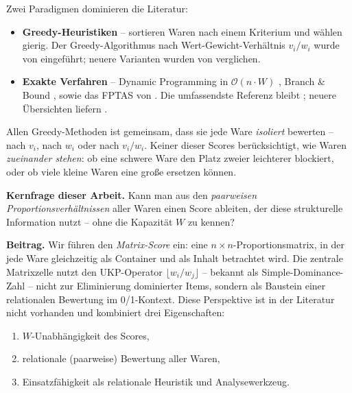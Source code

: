 \documentclass[a4paper,11pt]{article}
\begin{document}
\medskip
Zwei Paradigmen dominieren die Literatur:
\begin{itemize}[leftmargin=*,topsep=2pt]
  \item \textbf{Greedy-Heuristiken} -- sortieren Waren nach einem Kriterium
    und wählen gierig. Der Greedy-Algorithmus nach Wert-Gewicht-Verhältnis
    $v_i/w_i$ wurde von \citet{dantzig1957} eingeführt; neuere Varianten
    wurden von \citet{hristakeva2005,hristakeva2023} verglichen.
  \item \textbf{Exakte Verfahren} -- Dynamic Programming in
    $\mathcal{O}(n\cdot W)$ \citep{bellman1957}, Branch \& Bound
    \citep{kolesar1967}, sowie das FPTAS von \citet{ibarra1975}.
    Die umfassendste Referenz bleibt \citet{kellerer2004};
    neuere Übersichten liefern \citet{cacchiani2022}.
\end{itemize}

\noindent
Allen Greedy-Methoden ist gemeinsam, dass sie jede Ware
\emph{isoliert} bewerten -- nach $v_i$, nach $w_i$ oder nach $v_i/w_i$.
Keiner dieser Scores berücksichtigt, wie Waren \emph{zueinander stehen}:
ob eine schwere Ware den Platz zweier leichterer blockiert,
oder ob viele kleine Waren eine große ersetzen können.

\medskip
\noindent
\textbf{Kernfrage dieser Arbeit.}
Kann man aus den \emph{paarweisen Proportionsverhältnissen}
aller Waren einen Score ableiten, der diese strukturelle Information
nutzt -- ohne die Kapazität $W$ zu kennen?

\medskip
\noindent
\textbf{Beitrag.}
Wir führen den \emph{Matrix-Score} ein: eine $n\times n$-Proportionsmatrix,
in der jede Ware gleichzeitig als Container und als Inhalt betrachtet wird.
Die zentrale Matrixzelle nutzt den UKP-Operator
$\lfloor w_i/w_j \rfloor$ -- bekannt als Simple-Dominance-Zahl
\citep{kellerer2004} -- nicht zur Eliminierung dominierter Items,
sondern als Baustein einer relationalen Bewertung im 0/1-Kontext.
Diese Perspektive ist in der Literatur nicht vorhanden und kombiniert
drei Eigenschaften:

\begin{enumerate}[leftmargin=*,topsep=2pt]
  \item $W$-Unabhängigkeit des Scores,
  \item relationale (paarweise) Bewertung aller Waren,
  \item Einsatzfähigkeit als relationale Heuristik und Analysewerkzeug.
\end{enumerate}

\end{document}
